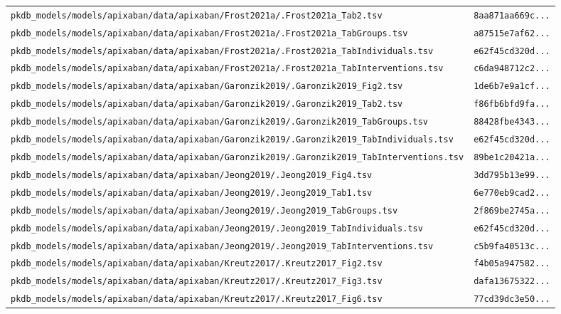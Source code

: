 \documentclass{article}
\begin{document}
\begin{longtable}{ll}
\texttt{pkdb\_models/models/apixaban/data/apixaban/Frost2021a/.Frost2021a\_Tab2.tsv} & \texttt{8aa871aa669c...} \\
\texttt{pkdb\_models/models/apixaban/data/apixaban/Frost2021a/.Frost2021a\_TabGroups.tsv} & \texttt{a87515e7af62...} \\
\texttt{pkdb\_models/models/apixaban/data/apixaban/Frost2021a/.Frost2021a\_TabIndividuals.tsv} & \texttt{e62f45cd320d...} \\
\texttt{pkdb\_models/models/apixaban/data/apixaban/Frost2021a/.Frost2021a\_TabInterventions.tsv} & \texttt{c6da948712c2...} \\
\texttt{pkdb\_models/models/apixaban/data/apixaban/Garonzik2019/.Garonzik2019\_Fig2.tsv} & \texttt{1de6b7e9a1cf...} \\
\texttt{pkdb\_models/models/apixaban/data/apixaban/Garonzik2019/.Garonzik2019\_Tab2.tsv} & \texttt{f86fb6bfd9fa...} \\
\texttt{pkdb\_models/models/apixaban/data/apixaban/Garonzik2019/.Garonzik2019\_TabGroups.tsv} & \texttt{88428fbe4343...} \\
\texttt{pkdb\_models/models/apixaban/data/apixaban/Garonzik2019/.Garonzik2019\_TabIndividuals.tsv} & \texttt{e62f45cd320d...} \\
\texttt{pkdb\_models/models/apixaban/data/apixaban/Garonzik2019/.Garonzik2019\_TabInterventions.tsv} & \texttt{89be1c20421a...} \\
\texttt{pkdb\_models/models/apixaban/data/apixaban/Jeong2019/.Jeong2019\_Fig4.tsv} & \texttt{3dd795b13e99...} \\
\texttt{pkdb\_models/models/apixaban/data/apixaban/Jeong2019/.Jeong2019\_Tab1.tsv} & \texttt{6e770eb9cad2...} \\
\texttt{pkdb\_models/models/apixaban/data/apixaban/Jeong2019/.Jeong2019\_TabGroups.tsv} & \texttt{2f869be2745a...} \\
\texttt{pkdb\_models/models/apixaban/data/apixaban/Jeong2019/.Jeong2019\_TabIndividuals.tsv} & \texttt{e62f45cd320d...} \\
\texttt{pkdb\_models/models/apixaban/data/apixaban/Jeong2019/.Jeong2019\_TabInterventions.tsv} & \texttt{c5b9fa40513c...} \\
\texttt{pkdb\_models/models/apixaban/data/apixaban/Kreutz2017/.Kreutz2017\_Fig2.tsv} & \texttt{f4b05a947582...} \\
\texttt{pkdb\_models/models/apixaban/data/apixaban/Kreutz2017/.Kreutz2017\_Fig3.tsv} & \texttt{dafa13675322...} \\
\texttt{pkdb\_models/models/apixaban/data/apixaban/Kreutz2017/.Kreutz2017\_Fig6.tsv} & \texttt{77cd39dc3e50...} \\

\end{longtable}
\end{document}
